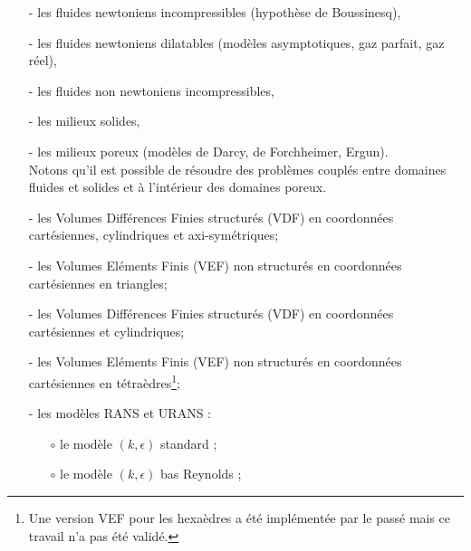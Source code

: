 \begin{itemize}
\begin{itemize}
\item[-]
les fluides newtoniens incompressibles (hypoth\`ese de Boussinesq),
\item[-]
les fluides newtoniens dilatables (mod\`eles asymptotiques, gaz parfait, gaz r\'eel),
\item[-]
les fluides non newtoniens incompressibles,
\item[-]
les milieux solides,
\item[-]
les milieux poreux (mod\`eles de Darcy, de Forchheimer, Ergun).\\
Notons qu'il est possible de r\'esoudre des probl\`emes coupl\'es entre domaines fluides et solides et \`a l'int\'erieur des domaines poreux.\\
\end{itemize}
\begin{itemize}
\item[-]
les Volumes Diff\'erences Finies structur\'es (VDF) en coordonn\'ees cart\'esiennes, cylindriques et axi-sym\'etriques;
\item[-]
les Volumes El\'ements Finis (VEF) non structur\'es en coordonn\'ees cart\'esiennes en triangles;\\
\end{itemize}
\begin{itemize}
\item[-]
les Volumes Diff\'erences Finies structur\'es (VDF) en coordonn\'ees cart\'esiennes et cylindriques;
\item[-]
les Volumes El\'ements Finis (VEF) non structur\'es en coordonn\'ees cart\'esiennes en t\'etra\`edres\footnote{Une version VEF pour les hexa\`edres a \'et\'e impl\'ement\'ee par le pass\'e mais ce travail n'a pas \'et\'e valid\'e.};\\
\end{itemize}
\begin{itemize}
\item[-]
les mod\`eles RANS et URANS :
\begin{itemize}
\item[$\circ$]
le mod\`ele $(k,\epsilon)$ standard ;
\item[$\circ$]
le mod\`ele $(k,\epsilon)$ bas Reynolds ;
\end{itemize}

\end{itemize}
\end{itemize}
